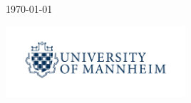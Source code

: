 \begin{titlepage}
	\vfill\vfill\vfill %
	
	{\large\today} %
	
	
	\vfill\vfill
	\includegraphics[width=0.5\textwidth]{img/logo-universitaet-mannheim.jpg}\\[1cm] 
	 
	
	\vfill %
	
\end{titlepage}
\hypersetup{pageanchor=true}